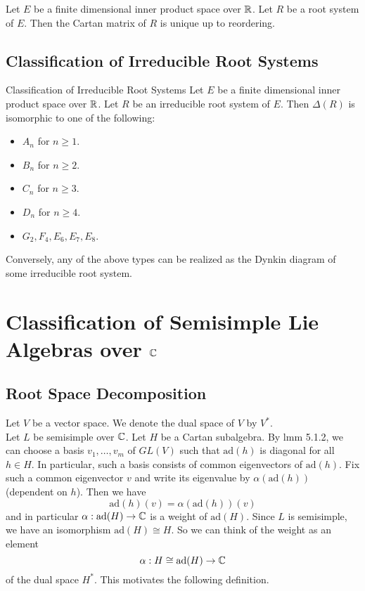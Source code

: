 \documentclass[a4paper]{article}
\begin{document}
\begin{prp}{}{} Let $E$ be a finite dimensional inner product space over $\mathbb{R}$. Let $R$ be a root system of $E$. Then the Cartan matrix of $R$ is unique up to reordering. 
\end{prp}

\subsection{Classification of Irreducible Root Systems}
\begin{thm}{Classification of Irreducible Root Systems}{} Let $E$ be a finite dimensional inner product space over $\mathbb{R}$. Let $R$ be an irreducible root system of $E$. Then $\Delta(R)$ is isomorphic to one of the following: 
\begin{itemize}
\item $A_n$ for $n\geq 1$. 
\item $B_n$ for $n\geq 2$. 
\item $C_n$ for $n\geq 3$. 
\item $D_n$ for $n\geq 4$. 
\item $G_2,F_4,E_6,E_7,E_8$. 
\end{itemize}
Conversely, any of the above types can be realized as the Dynkin diagram of some irreducible root system. 
\end{thm}

\pagebreak
\section{Classification of Semisimple Lie Algebras over $\mathbb{C}$}
\subsection{Root Space Decomposition}
Let $V$ be a vector space. We denote the dual space of $V$ by $V^\ast$. \\

Let $L$ be semisimple over $\mathbb{C}$. Let $H$ be a Cartan subalgebra. By lmm 5.1.2, we can choose a basis $v_1,\dots,v_m$ of $GL(V)$ such that $\text{ad}(h)$ is diagonal for all $h\in H$. In particular, such a basis consists of common eigenvectors of $\text{ad}(h)$. Fix such a common eigenvector $v$ and write its eigenvalue by $\alpha(\text{ad}(h))$ (dependent on $h$). Then we have $$\text{ad}(h)(v)=\alpha(\text{ad}(h))(v)$$ and in particular $\alpha:\text{ad}(H)\to\mathbb{C}$ is a weight of $\text{ad}(H)$. Since $L$ is semisimple, we have an isomorphism $\text{ad}(H)\cong H$. So we can think of the weight as an element $$\alpha:H\cong\text{ad}(H)\to\mathbb{C}$$ of the dual space $H^\ast$. This motivates the following definition. 
\end{document}
